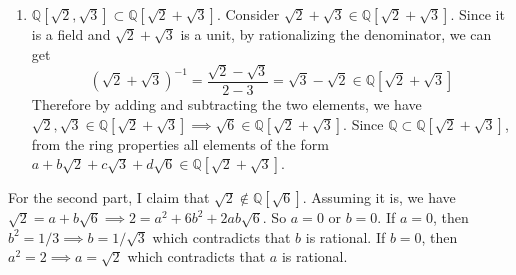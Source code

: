 \begin{solution}[Shifrin 3.2.2.b]
\begin{enumerate}
    \item $\mathbb{Q}[\sqrt{2}, \sqrt{3}] \subset \mathbb{Q}[ \sqrt{2} + \sqrt{3}]$. Consider $\sqrt{2} + \sqrt{3} \in \mathbb{Q}[\sqrt{2} + \sqrt{3}]$. Since it is a field and $\sqrt{2} + \sqrt{3}$ is a unit, by rationalizing the denominator, we can get 
      \begin{equation}
        (\sqrt{2} + \sqrt{3})^{-1} = \frac{\sqrt{2} - \sqrt{3}}{2 - 3} = \sqrt{3} - \sqrt{2} \in \mathbb{Q}[\sqrt{2} + \sqrt{3}]
      \end{equation}
      Therefore by adding and subtracting the two elements, we have $\sqrt{2}, \sqrt{3} \in \mathbb{Q}[\sqrt{2} + \sqrt{3}] \implies \sqrt{6} \in \mathbb{Q}[\sqrt{2} + \sqrt{3}]$. Since $\mathbb{Q} \subset \mathbb{Q}[\sqrt{2} + \sqrt{3}]$, from the ring properties all elements of the form $a + b \sqrt{2} + c \sqrt{3} + d \sqrt{6} \in \mathbb{Q}[\sqrt{2} + \sqrt{3}]$. 
    \end{enumerate}

    For the second part, I claim that $\sqrt{2} \not\in \mathbb{Q}[\sqrt{6}]$. Assuming it is, we have $\sqrt{2} = a + b \sqrt{6} \implies 2 = a^2 + 6b^2 + 2ab \sqrt{6}$. So $a = 0$ or $b = 0$. If $a = 0$, then $b^2 = 1/3 \implies b = 1/\sqrt{3}$ which contradicts that $b$ is rational. If $b = 0$, then $a^2 = 2 \implies a = \sqrt{2}$ which contradicts that $a$ is rational. 
  \end{solution}

